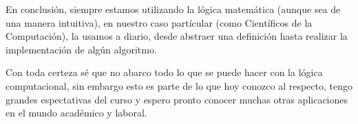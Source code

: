 \documentclass{article}
\begin{document}
\begin{enumerate}
  En conclusión, siempre estamos utilizando la lógica matemática (aunque
  sea de una manera intuitiva), en nuestro caso partícular (como Científicos
  de la Computación), la usamos a diario, desde abstraer una definición
  hasta realizar la implementación de algún algoritmo.
  
  Con toda certeza sé que no abarco todo lo que se puede hacer con la
  lógica computacional, sin embargo esto es parte de lo que hoy conozco
  al respecto, tengo grandes espectativas del curso y espero pronto
  conocer muchas otras aplicaciones en el mundo académico y laboral.
  
  \\
  
  \printbibliography
\end{enumerate}
\end{document}
